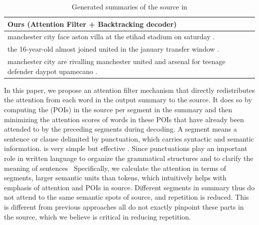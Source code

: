 \begin{table}[th!]
\begin{center}
\begin{tabular}{|l|}
\hline \bf Ours (Attention Filter + Backtracking decoder) \\
\hline manchester city face aston villa at the etihad stadium on saturday . \\
       the 16-year-old almost joined united in the january transfer window . \\
	   manchester city are rivalling manchester united and arsenal for teenage defender daypot upamecano .\\
\hline
\end{tabular}
\end{center}
\caption{\label{tab:strong_methods} Generated summaries of the source in }
\end{table}

In this paper, we propose an attention filter mechanism that directly 
redistributes the attention from each word in the output summary to the source. 
It does so by computing the \DIFdelbegin {}\DIFdelend \DIFaddbegin \textbf{} \DIFaddend (POIs) in the source
per segment in the summary
\DIFdelbegin \DIFdel{~
}\DIFdelend and then minimizing the attention scores of
words in these POIs that have already been attended to by the preceding 
segments during decoding. 
A segment means a sentence or clause delimited by punctuation,
which carries syntactic and semantic information. 
\DIFdelbegin {}\DIFdelend \DIFaddbegin {}\DIFaddend is very simple but effective \DIFaddbegin {}\DIFaddend . 
Since punctuations 
play an important role in written language to organize 
the grammatical structures and to clarify the meaning of sentences~\cite{briscoe1996,Kim19,LiWE19}
Specifically, we calculate the attention in terms of segments, larger semantic units than tokens, 
which intuitively helps with emphasis of attention and POIs in source.
Different segments in summary thus do not attend to the same semantic spots
of source, and repetition is reduced. 
This is different from previous approaches
\DIFdelbegin {}\DIFdelend \DIFaddbegin {}\DIFaddend all do not exactly pinpoint these parts in the source,
which we believe is critical in reducing repetition. 

